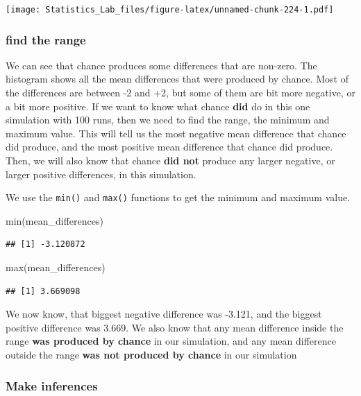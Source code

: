 \documentclass[
]{book}
\newenvironment{Shaded}{\begin{snugshade}}{\end{snugshade}}
\newcommand{\FunctionTok}[1]{\textcolor[rgb]{0.00,0.00,0.00}{#1}}
\newcommand{\NormalTok}[1]{#1}
\begin{document}
\texttt{[image: Statistics\_Lab\_files/figure-latex/unnamed-chunk-224-1.pdf]}

\hypertarget{find-the-range}{%
\subsubsection{find the range}\label{find-the-range}}

We can see that chance produces some differences that are non-zero. The histogram shows all the mean differences that were produced by chance. Most of the differences are between -2 and +2, but some of them are bit more negative, or a bit more positive. If we want to know what chance \textbf{did} do in this one simulation with 100 runs, then we need to find the range, the minimum and maximum value. This will tell us the most negative mean difference that chance did produce, and the most positive mean difference that chance did produce. Then, we will also know that chance \textbf{did not} produce any larger negative, or larger positive differences, in this simulation.

We use the \texttt{min()} and \texttt{max()} functions to get the minimum and maximum value.

\begin{Shaded}
\begin{Highlighting}[]
\FunctionTok{min}\NormalTok{(mean\_differences)}
\end{Highlighting}
\end{Shaded}

\begin{verbatim}
## [1] -3.120872
\end{verbatim}

\begin{Shaded}
\begin{Highlighting}[]
\FunctionTok{max}\NormalTok{(mean\_differences)}
\end{Highlighting}
\end{Shaded}

\begin{verbatim}
## [1] 3.669098
\end{verbatim}

We now know, that biggest negative difference was -3.121, and the biggest positive difference was 3.669. We also know that any mean difference inside the range \textbf{was produced by chance} in our simulation, and any mean difference outside the range \textbf{was not produced by chance} in our simulation

\hypertarget{make-inferences}{%
\subsubsection{Make inferences}\label{make-inferences}}
\end{document}
